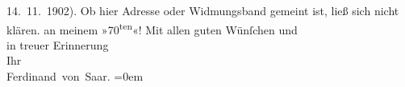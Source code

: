 \begin{ledgroupsized}[t]{13cm}
{{{                  14. 11. 1902). Ob hier Adresse oder Widmungsband gemeint ist, ließ
                  sich nicht klären.}}}\label{K_L01240_1h} an meinem »70\textsuperscript{ten}«!\pend
           \pstart
           Mit allen guten Wünſchen und{\\[\baselineskip]}in treuer Erinnerung{\\[\baselineskip]}Ihr{\\[\baselineskip]}\spacefill\mbox{Ferdinand von Saar.}\pend
           \leftskip=0em{}
         
         \endnumbering{}\end{ledgroupsized}  \newcommand{\dateiname}{L01240}\newcommand{\titel}{Ferdinand von Saar an Arthur Schnitzler, 11. 10. 1902}\newcommand{\editorInnen}{Martin Anton Müller und Gerd-Hermann Susen}
      